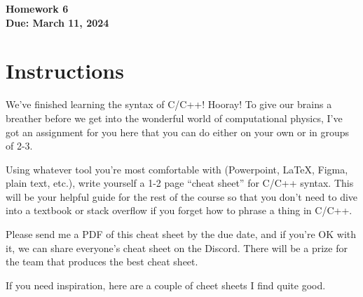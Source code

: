 \documentclass[11pt]{article}
\begin{document}
\begin{center}
\textbf{\Large Homework 6}\\
\textbf{Due: March 11, 2024}\\
\end{center}
\section*{Instructions}
We've finished learning the syntax of C/C++! Hooray! To give our brains a
breather before we get into the wonderful world of computational physics, I've
got an assignment for you here that you can do either on your own or in groups
of 2-3.

Using whatever tool you're most comfortable with (Powerpoint, LaTeX, Figma,
plain text, etc.), write yourself a 1-2 page ``cheat sheet'' for C/C++ syntax.
This will be your helpful guide for the rest of the course so that you don't
need to dive into a textbook or stack overflow if you forget how to phrase a
thing in C/C++.

Please send me a PDF of this cheat sheet by the due date, and if you're OK with
it, we can share everyone's cheat sheet on the Discord.  There will be a prize
for the team that produces the best cheat sheet.

If you need inspiration, here are a couple of cheet sheets I find quite good.
\end{document}
